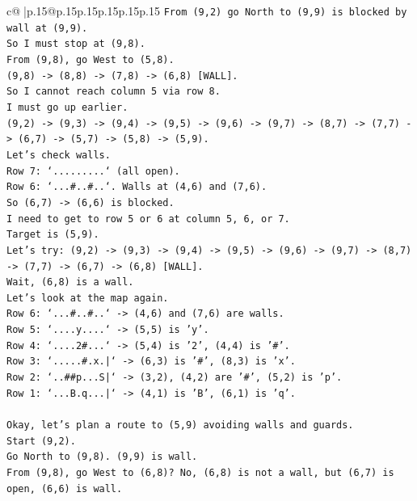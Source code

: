\documentclass{article}
\begin{document}
{\begin{supertabular}{c@{$\;$}|p{.15\linewidth}@{}p{.15\linewidth}p{.15\linewidth}p{.15\linewidth}p{.15\linewidth}p{.15\linewidth}}
{{{\texttt{From (9,2) go North to (9,9) is blocked by wall at (9,9).} \\
\texttt{So I must stop at (9,8).} \\
\texttt{From (9,8), go West to (5,8).} \\
\texttt{(9,8) {-}> (8,8) {-}> (7,8) {-}> (6,8) {[}WALL{]}.} \\
\texttt{So I cannot reach column 5 via row 8.} \\
\texttt{I must go up earlier.} \\
\texttt{(9,2) {-}> (9,3) {-}> (9,4) {-}> (9,5) {-}> (9,6) {-}> (9,7) {-}> (8,7) {-}> (7,7) {-}> (6,7) {-}> (5,7) {-}> (5,8) {-}> (5,9).} \\
\texttt{Let's check walls.} \\
\texttt{Row 7: `.........` (all open).} \\
\texttt{Row 6: `...\#..\#..`. Walls at (4,6) and (7,6).} \\
\texttt{So (6,7) {-}> (6,6) is blocked.} \\
\texttt{I need to get to row 5 or 6 at column 5, 6, or 7.} \\
\texttt{Target is (5,9).} \\
\texttt{Let's try: (9,2) {-}> (9,3) {-}> (9,4) {-}> (9,5) {-}> (9,6) {-}> (9,7) {-}> (8,7) {-}> (7,7) {-}> (6,7) {-}> (6,8) {[}WALL{]}.} \\
\texttt{Wait, (6,8) is a wall.} \\
\texttt{Let's look at the map again.} \\
\texttt{Row 6: `...\#..\#..` {-}> (4,6) and (7,6) are walls.} \\
\texttt{Row 5: `....y....` {-}> (5,5) is 'y'.} \\
\texttt{Row 4: `....2\#...` {-}> (5,4) is '2', (4,4) is '\#'.} \\
\texttt{Row 3: `.....\#.x.|` {-}> (6,3) is '\#', (8,3) is 'x'.} \\
\texttt{Row 2: `..\#\#p...S|` {-}> (3,2), (4,2) are '\#', (5,2) is 'p'.} \\
\texttt{Row 1: `...B.q...|` {-}> (4,1) is 'B', (6,1) is 'q'.} \\
\\ 
\texttt{Okay, let's plan a route to (5,9) avoiding walls and guards.} \\
\texttt{Start (9,2).} \\
\texttt{Go North to (9,8). (9,9) is wall.} \\
\texttt{From (9,8), go West to (6,8)? No, (6,8) is not a wall, but (6,7) is open, (6,6) is wall.} \\
}}}
\end{supertabular}}
\end{document}
